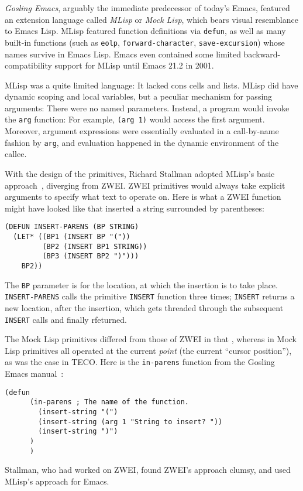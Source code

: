 \documentclass[format=acmsmall, review]{acmart}
\newcommand \Elisp {Emacs Lisp}
\begin{document}
\emph{Gosling Emacs}, arguably the immediate predecessor of today's Emacs,
featured an extension language called \emph{MLisp} or \emph{Mock Lisp},
which bears visual resemblance to \Elisp{}.  MLisp featured function
definitions via \texttt{defun}, as well as many built-in functions (such as
\texttt{eolp}, \texttt{forward-character}, \texttt{save-excursion}) whose
names survive in \Elisp{}.  Emacs even contained some limited
back\-ward-compatibility support for MLisp until Emacs 21.2 in 2001.

MLisp was a quite limited language: It lacked cons cells and lists.
MLisp did have dynamic scoping and local variables, but a peculiar
mechanism for passing arguments:  There were no named
parameters.  Instead, a program would invoke the \texttt{arg}
function: For example, \texttt{(arg 1)} would access the first
argument.  Moreover, argument expressions were essentially evaluated
in a call-by-name fashion by \texttt{arg}, and evaluation happened in
the dynamic environment of the callee.

With the design of the primitives, Richard Stallman adopted MLisp's
basic approach~\cite{Stallman2018-personal}, diverging from ZWEI.
ZWEI primitives would always take explicit arguments to specify what
text to operate on.  Here is what a ZWEI function might have looked
like that inserted a string surrounded by parentheses:
%
\begin{verbatim}
(DEFUN INSERT-PARENS (BP STRING)
  (LET* ((BP1 (INSERT BP "("))
         (BP2 (INSERT BP1 STRING))
         (BP3 (INSERT BP2 ")")))
    BP2))
\end{verbatim}
%
The \texttt{BP} parameter is for the location, at which the insertion
is to take place.  \texttt{INSERT-PARENS} calls the primitive
\texttt{INSERT} function three times; \texttt{INSERT} returns a new
location, after the insertion, which gets threaded through the
subsequent \texttt{INSERT} calls and finally rfeturned.

The Mock Lisp primitives differed from those of ZWEI in that , whereas in
Mock Lisp primitives all operated at the current \emph{point} (the current
``cursor position''), as was the case in TECO.  Here is the
\texttt{in-parens} function from the Gosling Emacs manual~\cite{Gosling1981}:
%
\begin{verbatim}
(defun 
      (in-parens ; The name of the function.
        (insert-string "(") 
        (insert-string (arg 1 "String to insert? ")) 
        (insert-string ")") 
      ) 
      )
\end{verbatim}
%
Stallman, who had worked on ZWEI, found ZWEI's approach clumsy, and
used MLisp's approach for Emacs.
\end{document}
